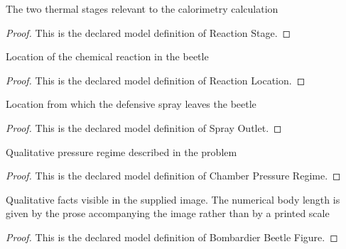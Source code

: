 \begin{definition}
  \label{def:physics:phyx-mini-0332:phyxminiproblems-problemphyxmini0332-reactionstage}
  The two thermal stages relevant to the calorimetry calculation
\end{definition}
\begin{proof}
  This is the declared model definition of Reaction Stage.
\end{proof}
\begin{definition}
  \label{def:physics:phyx-mini-0332:phyxminiproblems-problemphyxmini0332-reactionlocation}
  Location of the chemical reaction in the beetle
\end{definition}
\begin{proof}
  This is the declared model definition of Reaction Location.
\end{proof}
\begin{definition}
  \label{def:physics:phyx-mini-0332:phyxminiproblems-problemphyxmini0332-sprayoutlet}
  Location from which the defensive spray leaves the beetle
\end{definition}
\begin{proof}
  This is the declared model definition of Spray Outlet.
\end{proof}
\begin{definition}
  \label{def:physics:phyx-mini-0332:phyxminiproblems-problemphyxmini0332-chamberpressureregime}
  Qualitative pressure regime described in the problem
\end{definition}
\begin{proof}
  This is the declared model definition of Chamber Pressure Regime.
\end{proof}
\begin{definition}
  \label{def:physics:phyx-mini-0332:phyxminiproblems-problemphyxmini0332-bombardierbeetlefigure}
  Qualitative facts visible in the supplied image. The numerical body length is given by the prose accompanying the image rather than by a printed scale
\end{definition}
\begin{proof}
  This is the declared model definition of Bombardier Beetle Figure.
\end{proof}
